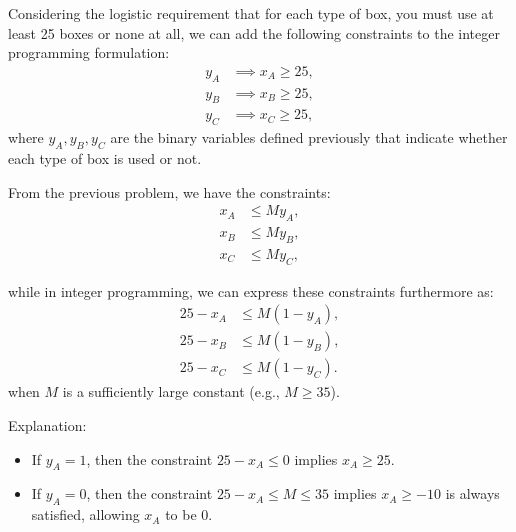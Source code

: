 \documentclass[a4paper, 10pt]{article}
\begin{document}
\begin{solution}
Considering the logistic requirement that for each type of box, you must use at least 25 boxes or none at all, we can add the following constraints to the integer programming formulation:
\begin{align*}
    y_A &\implies x_A \ge 25, \\
    y_B &\implies x_B \ge 25, \\
    y_C &\implies x_C \ge 25,
\end{align*}
where \( y_A, y_B, y_C \) are the binary variables defined previously that indicate whether each type of box is used or not.

\vspace{4mm}

From the previous problem, we have the constraints:
\begin{align*}
    x_A &\leq My_A, \\
    x_B &\leq My_B, \\
    x_C &\leq My_C,
\end{align*}

while in integer programming, we can express these constraints furthermore as:
\begin{align*}
    25 - x_A &\leq M(1 - y_A), \\
    25 - x_B &\leq M(1 - y_B), \\
    25 - x_C &\leq M(1 - y_C).
\end{align*}
when \( M \) is a sufficiently large constant (e.g., \( M \geq 35 \)).

\vspace{4mm}

Explanation:
\begin{itemize}
    \item If \( y_A = 1 \), then the constraint \( 25 - x_A \leq 0 \) implies \( x_A \geq 25 \).
    \item If \( y_A = 0 \), then the constraint \( 25 - x_A \leq M \leq 35 \) implies \( x_A \geq -10 \) is always satisfied, allowing \( x_A \) to be 0.
\end{itemize}


\end{solution}
\end{document}
